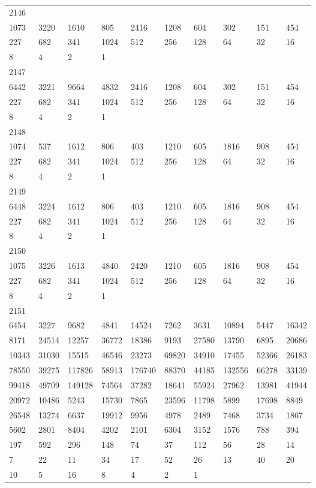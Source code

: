 \begin{longtable}{*{10}{l}}
2146&&&&&&&&&\\
1073& 3220& 1610& 805& 2416& 1208& 604& 302& 151& 454\\
227& 682& 341& 1024& 512& 256& 128& 64& 32& 16\\
8& 4& 2& 1& \\

2147&&&&&&&&&\\
6442& 3221& 9664& 4832& 2416& 1208& 604& 302& 151& 454\\
227& 682& 341& 1024& 512& 256& 128& 64& 32& 16\\
8& 4& 2& 1& \\

2148&&&&&&&&&\\
1074& 537& 1612& 806& 403& 1210& 605& 1816& 908& 454\\
227& 682& 341& 1024& 512& 256& 128& 64& 32& 16\\
8& 4& 2& 1& \\

2149&&&&&&&&&\\
6448& 3224& 1612& 806& 403& 1210& 605& 1816& 908& 454\\
227& 682& 341& 1024& 512& 256& 128& 64& 32& 16\\
8& 4& 2& 1& \\

2150&&&&&&&&&\\
1075& 3226& 1613& 4840& 2420& 1210& 605& 1816& 908& 454\\
227& 682& 341& 1024& 512& 256& 128& 64& 32& 16\\
8& 4& 2& 1& \\

2151&&&&&&&&&\\
6454& 3227& 9682& 4841& 14524& 7262& 3631& 10894& 5447& 16342\\
8171& 24514& 12257& 36772& 18386& 9193& 27580& 13790& 6895& 20686\\
10343& 31030& 15515& 46546& 23273& 69820& 34910& 17455& 52366& 26183\\
78550& 39275& 117826& 58913& 176740& 88370& 44185& 132556& 66278& 33139\\
99418& 49709& 149128& 74564& 37282& 18641& 55924& 27962& 13981& 41944\\
20972& 10486& 5243& 15730& 7865& 23596& 11798& 5899& 17698& 8849\\
26548& 13274& 6637& 19912& 9956& 4978& 2489& 7468& 3734& 1867\\
5602& 2801& 8404& 4202& 2101& 6304& 3152& 1576& 788& 394\\
197& 592& 296& 148& 74& 37& 112& 56& 28& 14\\
7& 22& 11& 34& 17& 52& 26& 13& 40& 20\\
10& 5& 16& 8& 4& 2& 1& \\


\end{longtable}
